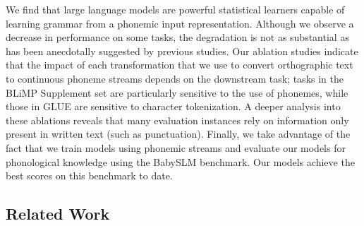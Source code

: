 We find that large language models are powerful statistical learners capable of learning grammar from a phonemic input representation. Although we observe a decrease in performance on some tasks, the degradation is not as substantial as has been anecdotally suggested by previous studies. Our ablation studies indicate that the impact of each transformation that we use to convert orthographic text to continuous phoneme streams depends on the downstream task; tasks in the BLiMP Supplement set are particularly sensitive to the use of phonemes, while those in GLUE are sensitive to character tokenization. A deeper analysis into these ablations reveals that many evaluation instances rely on information only present in written text (such as punctuation). Finally, we take advantage of the fact that we train models using phonemic streams and evaluate our models for phonological knowledge using the BabySLM benchmark. Our models achieve the best scores on this benchmark to date.%



\subsection{Related Work}


